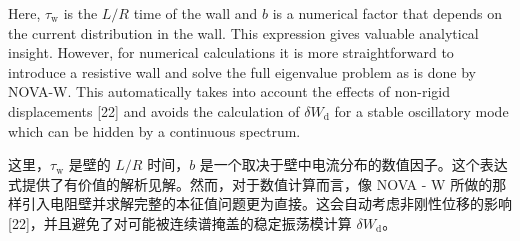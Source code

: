 \documentclass[utf8]{ctexart}
\newcommand\enzhbox[2]{
  	\quad\par \begin{paracol}{2} \colseprulecolor{black} 
  		\begin{spacing}{1.0}
  			\footnotesize  #1
  		\end{spacing}
  		\switchcolumn[1] 
  		#2
  	\end{paracol} \quad\par
  }
\begin{document}
\begin{sloppypar}
\enzhbox{  Here, $\tau_{\mathrm{w}}$ is the $L / R$ time of the wall and $b$ is a numerical factor that depends on the current distribution in the wall. This expression gives valuable analytical insight. However, for numerical calculations it is more straightforward to introduce a resistive wall and solve the full eigenvalue problem as is done by NOVA-W. This automatically takes into account the effects of non-rigid displacements \textcolor{green!50!black}{[22]} and avoids the calculation of $\delta W_{\mathrm{d}}$ for a stable oscillatory mode which can be hidden by a continuous spectrum.}{
这里，$\tau_{\mathrm{w}}$ 是壁的 $L / R$ 时间，$b$ 是一个取决于壁中电流分布的数值因子。这个表达式提供了有价值的解析见解。然而，对于数值计算而言，像 NOVA - W 所做的那样引入电阻壁并求解完整的本征值问题更为直接。这会自动考虑非刚性位移的影响 \textcolor{green!50!black}{[22]}，并且避免了对可能被连续谱掩盖的稳定振荡模计算 $\delta W_{\mathrm{d}}$。 }
  

\end{sloppypar}
\end{document}
